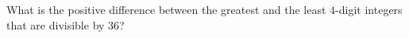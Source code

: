 What is the positive difference between the greatest and the least $4$-digit integers that are divisible by $36$?
